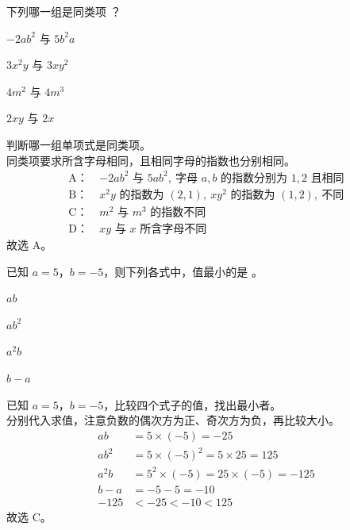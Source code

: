 \documentclass[12pt,a4paper,fontset=none]{exam-zh}
\begin{document}
\begin{question}
    下列哪一组是同类项 \paren[A]？
    \begin{choices}
        \item $-2ab^2$ 与 $5b^2a$
        \item $3x^2y$ 与 $3xy^2$
        \item $4m^2$ 与 $4m^3$
        \item $2xy$ 与 $2x$
    \end{choices}
\end{question}

\begin{solution}
    判断哪一组单项式是同类项。 \\
    同类项要求所含字母相同，且相同字母的指数也分别相同。
    \begin{align*}
        \text{A：}\ & -2ab^2 \text{ 与 } 5ab^2,\ \text{字母 } a,b \text{ 的指数分别为 } 1,2 \text{ 且相同} \\
        \text{B：}\ & x^2y \text{ 的指数为 } (2,1),\ xy^2 \text{ 的指数为 } (1,2),\ \text{不同} \\
        \text{C：}\ & m^2 \text{ 与 } m^3 \text{ 的指数不同} \\
        \text{D：}\ & xy \text{ 与 } x \text{ 所含字母不同}
    \end{align*}
    故选 A。
\end{solution}

\begin{question}
    已知 $a=5$，$b=-5$，则下列各式中，值最小的是 \paren[C]。
    \begin{choices}
        \item $ab$
        \item $ab^2$
        \item $a^2b$
        \item $b-a$
    \end{choices}
\end{question}

\begin{solution}
    已知 $a=5$，$b=-5$，比较四个式子的值，找出最小者。 \\
    分别代入求值，注意负数的偶次方为正、奇次方为负，再比较大小。
    \begin{align*}
        ab &= 5\times(-5) = -25 \\
        ab^2 &= 5\times(-5)^2 = 5\times 25 = 125 \\
        a^2b &= 5^2\times(-5) = 25\times(-5) = -125 \\
        b-a &= -5-5 = -10 \\
        -125 &< -25 < -10 < 125
    \end{align*}
    故选 C。
\end{solution}
\end{document}
